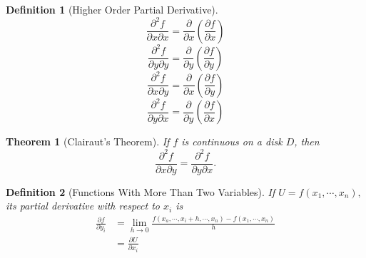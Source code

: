 \documentclass[12pt,a4paper]{article}
\newtheorem{thm}{Theorem}[subsection]
\newtheorem{df}{Definition}[subsection]
\def\dsst{\displaystyle}
\def\del{\partial}
\def\pdx{\del x}
\def\pdx{\del y}
\def\pdfdx{\dsst\frac{\del f}{\del x}}
\def\pdfdy{\dsst\frac{\del f}{\del y}}
\def\pdfdxdx{\dsst\frac{\del^2 f}{\del x\del x}}
\def\pdfdydy{\dsst\frac{\del^2 f}{\del y\del y}}
\def\pdfdxdy{\dsst\frac{\del^2 f}{\del x\del y}}
\def\pdfdydx{\dsst\frac{\del^2 f}{\del y\del x}}
\def\pddx{\dsst\frac{\del }{\del x}}
\def\pddy{\dsst\frac{\del }{\del y}}
\begin{document}
\begin{df}[Higher Order Partial Derivative]
	\[\pdfdxdx=\pddx\left(\pdfdx\right)\]
	\[\pdfdydy=\pddy\left(\pdfdy\right)\]
	\[\pdfdxdy=\pddx\left(\pdfdy\right)\]
	\[\pdfdydx=\pddy\left(\pdfdx\right)\]
\end{df}
\begin{thm}[Clairaut's Theorem]
	If $f$ is continuous on a disk $D$, then \[\pdfdxdy=\pdfdydx.\]
\end{thm}
\begin{df}[Functions With More Than Two Variables]
	If $U=f(x_1,\cdots,x_n),$ its partial derivative with respect to $x_i$ is \[\begin{aligned}
		\frac{\partial f}{\pdx_i}&=\lim_{h\to0}\frac{f(x_a,\cdots,x_i+h,\cdots,x_n)-f(x_1,\cdots,x_n)}{h}\\&=\frac{\partial U}{\partial x_i}
	\end{aligned}\]	
\end{df}
\end{document}
